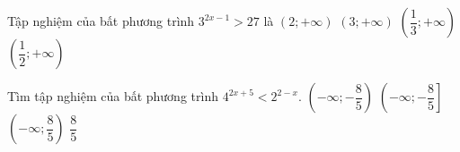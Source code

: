 \begin{ex}%
	Tập nghiệm của bất phương trình $3^{2x-1}>27$ là
	\choice
	{\True $(2;+\infty)$}
	{$(3;+\infty)$}
	{$\left( \dfrac{1}{3};+\infty \right)$}
	{$\left( \dfrac{1}{2};+\infty \right)$}
\end{ex}

\begin{ex}%
	Tìm tập nghiệm của bất phương trình $4^{2x+5}<2^{2-x}$.
	\choice
	{\True $\left(-\infty;-\dfrac{8}{5}\right)$}
	{$\left(-\infty;-\dfrac{8}{5}\right]$}
	{$\left(-\infty;\dfrac{8}{5}\right)$}
	{$\dfrac{8}{5}$}
\end{ex}


